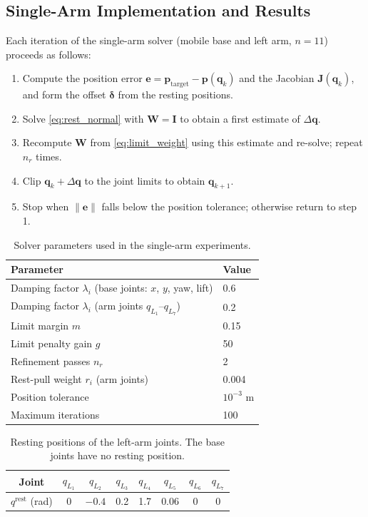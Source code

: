 \documentclass[12pt,a4paper]{article}
\begin{document}
\subsection*{Single-Arm Implementation and Results}
Each iteration of the single-arm solver (mobile base and left arm, $n=11$) proceeds as follows:
\begin{enumerate}
    \item Compute the position error $\mathbf{e}=\mathbf{p}_{\mathrm{target}}-\mathbf{p}(\mathbf{q}_k)$ and the Jacobian $\mathbf{J}(\mathbf{q}_k)$, and form the offset $\boldsymbol{\delta}$ from the resting positions.
    \item Solve \eqref{eq:rest_normal} with $\mathbf{W}=\mathbf{I}$ to obtain a first estimate of $\Delta\mathbf{q}$.
    \item Recompute $\mathbf{W}$ from \eqref{eq:limit_weight} using this estimate and re-solve; repeat $n_r$ times.
    \item Clip $\mathbf{q}_k+\Delta\mathbf{q}$ to the joint limits to obtain $\mathbf{q}_{k+1}$.
    \item Stop when $\|\mathbf{e}\|$ falls below the position tolerance; otherwise return to step 1.
\end{enumerate}

\begin{table}[htbp]
    \centering
    \begin{tabular}{l l}
        \hline
        Parameter & Value \\
        \hline
        Damping factor $\lambda_i$ (base joints: $x$, $y$, yaw, lift) & 0.6 \\
        Damping factor $\lambda_i$ (arm joints $q_{L_1}$--$q_{L_7}$) & 0.2 \\
        Limit margin $m$ & 0.15 \\
        Limit penalty gain $g$ & 50 \\
        Refinement passes $n_r$ & 2 \\
        Rest-pull weight $r_i$ (arm joints) & 0.004 \\
        Position tolerance & $10^{-3}$ m \\
        Maximum iterations & 100 \\
        \hline
    \end{tabular}
    \caption{\small{Solver parameters used in the single-arm experiments.}}
    \label{tab:single_arm_params}
\end{table}

\begin{table}[htbp]
    \centering
    \begin{tabular}{c c c c c c c c}
        \hline
        Joint & $q_{L_1}$ & $q_{L_2}$ & $q_{L_3}$ & $q_{L_4}$ & $q_{L_5}$ & $q_{L_6}$ & $q_{L_7}$ \\
        \hline
        $q^{\mathrm{rest}}$ (rad) & 0 & $-0.4$ & 0.2 & 1.7 & 0.06 & 0 & 0 \\
        \hline
    \end{tabular}
    \caption{\small{Resting positions of the left-arm joints. The base joints have no resting position.}}
    \label{tab:rest_positions}
\end{table}
\end{document}
